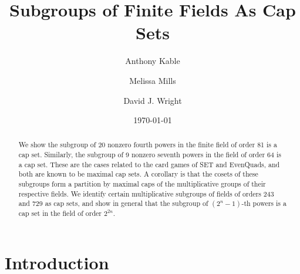 \documentclass[12pt]{amsart}
\theoremstyle{definition}
\begin{document}
\title{Subgroups of Finite Fields As Cap Sets}

\author{{Anthony Kable}
  \and{Melissa Mills} \and{David J. Wright}}

\address{Dept. of
  Math.\\Oklahoma State University\\401 MSCS\\Stillwater, OK 74078}

\date{\today}


\maketitle

\begin{abstract}
  We show the subgroup of 20 nonzero fourth powers in the finite field
  of order 81 is a cap set. Similarly, the subgroup of 9 nonzero
  seventh powers in the field of order 64 is a cap set. These are the
  cases related to the card games of SET and EvenQuads, and both are
  known to be maximal cap sets. A corollary is that the cosets of
  these subgroups form a partition by maximal caps of the
  multiplicative groups of their respective fields. We identify
  certain multiplicative subgroups of fields of orders 243 and 729
  as cap sets, and show in general that the subgroup of $(2^n-1)$-th
  powers is a cap set in the field of order $2^{2n}$.
\end{abstract}

\section{Introduction}
\end{document}
